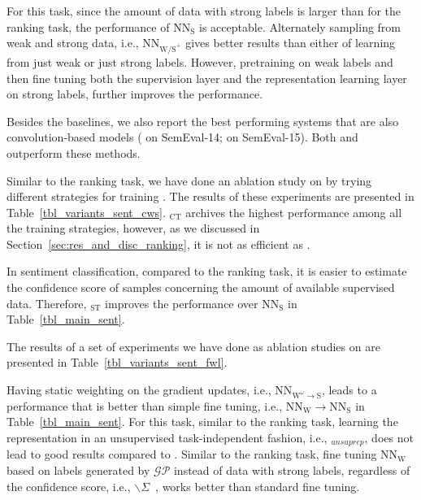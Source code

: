 For this task, since the amount of data with strong labels is larger than for the ranking task, the performance of $\text{NN}_{\text{S}}$ is acceptable. Alternately sampling from weak and strong data, i.e.,  $\text{NN}_{\text{W}\text{/S}^+}$ gives better results than either of learning from just weak or just strong labels. However, pretraining on weak labels and then fine tuning both the supervision layer and the representation learning layer on strong labels, further improves the performance.  

Besides the baselines, we also report the best performing systems that are also convolution-based models (\citealt{Rouvier:2016} on SemEval-14; \citealt{Deriu2016:SemEval} on SemEval-15). Both \cws and \fwl outperform these methods.



Similar to the ranking task, we have done an ablation study on \cws by trying different strategies for training \cws. The results of these experiments are presented in Table~\ref{tbl_variants_sent_cws}. \cwsnospace$_\text{CT}$ archives the highest performance among all the training strategies, however, as we discussed in Section~\ref{sec:res_and_disc_ranking}, it is not as efficient as \cws. 

In sentiment classification, compared to the ranking task, it is easier to estimate the confidence score of samples concerning the amount of available supervised data. Therefore, \cwsnospace$_\text{ST}$ improves the performance over $\text{NN}_{\text{S}}$ in Table~\ref{tbl_main_sent}. 



The results of a set of experiments we have done as ablation studies on \fwl are presented in Table~\ref{tbl_variants_sent_fwl}. 

Having static weighting on the gradient updates, i.e., NN$_{\text{W}^\omega \to \text{S}}$, leads to a performance that is better than simple fine tuning, i.e., $\text{NN}_{\text{W}} \to \text{NN}_{\text{S}}$ in Table~\ref{tbl_main_sent}.
%
For this task, similar to the ranking task, learning the representation in an unsupervised task-independent fashion, i.e., \fwlnospace$_{unsuprep}$, does not lead to good results compared to \fwl.
%
Similar to the ranking task, fine tuning $\text{NN}_{\text{W}}$ based on labels generated by $\mathcal{GP}$ instead of data with strong labels, regardless of the confidence score, i.e., \fwlnospace$\backslash\Sigma$~\citep{Veit:2017}, works better than standard fine tuning. 